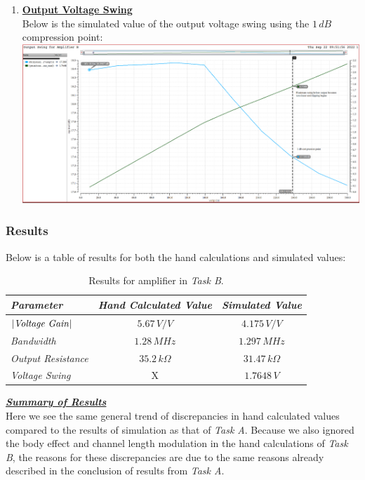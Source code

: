 \documentclass[12pt, fleqn]{article}
\begin{document}
\begin{enumerate}
{    }
    \item
    {
    \textbf{\underline{Output Voltage Swing}}\\[0.25cm]
    Below is the simulated value of the output voltage swing using the $1\,dB$ compression point:\\[0.1cm]
    \includegraphics[scale=0.35, center]{b_swing.png}\\[0.5cm]
    }
\end{enumerate}
\newpage
\subsubsection{Results}
Below is a table of results for both the hand calculations and simulated values:

\begin{table}[H]
\centering
\setlength{\tabcolsep}{20pt}
\renewcommand{\arraystretch}{1.5}
\begin{tabular}{|l|c|c|}
    \hline
    \textbf{\textit{Parameter}} & \textbf{\textit{Hand Calculated Value}} & \textbf{\textit{Simulated Value}}\\
    \hline
    $\left|\text{\textit{Voltage Gain}}\right|$ & $5.67\,V/V$ & $4.175\,V/V$\\
    \hline
    \textit{Bandwidth} & $1.28\,MHz$ & $1.297\,MHz$\\
    \hline
    \textit{Output Resistance} & $35.2\,k\Omega$ & $31.47\,k\Omega$\\
    \hline
    \textit{Voltage Swing} & X & $1.7648\,V$\\
    \hline
\end{tabular}
\caption{Results for amplifier in \textit{Task B}.}
\end{table}
\noindent
\underline{\textbf{\textit{Summary of Results}}}\\[0.25cm]
Here we see the same general trend of discrepancies in hand calculated values compared to the results of simulation as that of \textit{Task A}.  Because we also ignored the body effect and channel length modulation in the hand calculations of \textit{Task B}, the reasons for these discrepancies are due to the same reasons already described in the conclusion of results from \textit{Task A}.
\newpage
\end{document}
